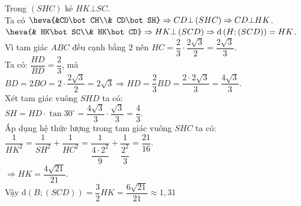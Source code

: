 \begin{ex}
{Trong $\left(SHC\right)$ kẻ $HK\bot SC$.\\
Ta có $\heva{&CD\bot CH\\& CD\bot SH} \Rightarrow CD \bot \left(SHC\right)\Rightarrow CD\bot HK$.\\
$\heva{& HK\bot SC\\& HK\bot CD} \Rightarrow HK\bot \left(SCD\right) \Rightarrow \mathrm{d}\left(H;\left(SCD\right) \right)=HK$.\\
Vì tam giác $ABC$ đều cạnh bằng $2$ nên $HC=\dfrac{2}{3}\cdot\dfrac{2\sqrt{3}}{2}=\dfrac{2\sqrt{3}}{3}$.\\
Ta có: $\dfrac{HD}{BD}=\dfrac{2}{3}$, mà $BD=2BO=2\cdot\dfrac{2\sqrt{3}}{2}=2\sqrt{3}\Rightarrow HD=\dfrac{2}{3}BD=\dfrac{2\cdot 2 \sqrt{3}}{3}=\dfrac{4\sqrt{3}}{3}$.\\
Xét tam giác vuông $SHD$ ta có:\\ $SH=HD\cdot\tan{30^\circ}=\dfrac{4\sqrt{3}}{3}\cdot\dfrac{\sqrt{3}}{3}=\dfrac{4}{3}$.\\
Áp dụng hệ thức lượng trong tam giác vuông $SHC$ ta có:\\
$\dfrac{1}{HK^2}=\dfrac{1}{SH^2}+\dfrac{1}{HC^2}=\dfrac{1}{\dfrac{{{4\cdot2}^2}}{9}}+\dfrac{1}{\dfrac{2^2}{3}}=\dfrac{21}{16}$.\\
$\Rightarrow HK=\dfrac{4\sqrt{21}}{21}$.\\
Vậy $\mathrm{d}\left(B;\left(SCD\right) \right)=\dfrac{3}{2}HK=\dfrac{6\sqrt{21}}{21}\approx 1{,}31$}
\end{ex}

